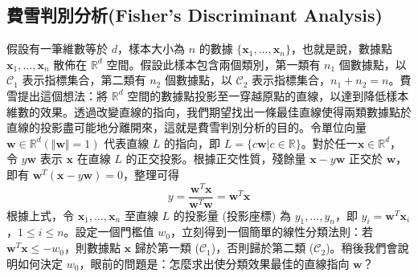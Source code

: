 \subsection{費雪判別分析(Fisher's Discriminant Analysis)}
假設有一筆維數等於 $d$，樣本大小為 $n$ 的數據 $\{\mathbf{x}_1,\ldots,\mathbf{x}_n\}$，也就是說，數據點 $\mathbf{x}_1,\ldots,\mathbf{x}_n$ 散佈在 $\mathbb{R}^d$ 空間。假設此樣本包含兩個類別，第一類有 $n_1$ 個數據點，以 $\mathcal{C}_1$ 表示指標集合，第二類有 $n_2$ 個數據點，以 $\mathcal{C}_2$ 表示指標集合，$n_1+n_2=n$。費雪提出這個想法：將 $\mathbb{R}^d$ 空間的數據點投影至一穿越原點的直線，以達到降低樣本維數的效果。透過改變直線的指向，我們期望找出一條最佳直線使得兩類數據點於直線的投影盡可能地分離開來，這就是費雪判別分析的目的。令單位向量 $\mathbf{w}\in\mathbb{R}^d (\Vert\mathbf{w}\Vert=1)$ 代表直線 $L$ 的指向，即 $L=\{c\mathbf{w}\vert c\in\mathbb{R}\}$。對於任一$\mathbf{x}\in\mathbb{R}^d$，令 $y\mathbf{w}$ 表示 $\mathbf{x}$ 在直線 $L$ 的正交投影。根據正交性質，殘餘量 $\mathbf{x}-y\mathbf{w}$ 正交於 $\mathbf{w}$，即有 $\mathbf{w}^T(\mathbf{x}-y\mathbf{w})=0$，整理可得
$$\displaystyle  y=\frac{\mathbf{w}^T\mathbf{x}}{\mathbf{w}^T\mathbf{w}}=\mathbf{w}^T\mathbf{x}$$
根據上式，令 $\mathbf{x}_1,\ldots,\mathbf{x}_n$ 至直線 $L$ 的投影量 (投影座標) 為 $y_1,\ldots,y_n$，即 $y_i=\mathbf{w}^T\mathbf{x}_i$，$1\le i\le n$。設定一個門檻值 $w_0$，立刻得到一個簡單的線性分類法則：若 $\mathbf{w}^T\mathbf{x}\le-w_0$，則數據點 $\mathbf{x}$ 歸於第一類 ($\mathcal{C}_1$)，否則歸於第二類 ($\mathcal{C}_2$)。稍後我們會說明如何決定 $w_0$，眼前的問題是：怎麼求出使分類效果最佳的直線指向 $\mathbf{w}$？

